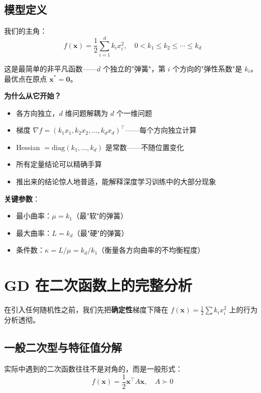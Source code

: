 \documentclass[12pt, a4paper]{ctexart}
\begin{document}
\subsection{模型定义}

我们的主角：
\begin{equation}
    f(\bm{x}) = \frac{1}{2}\sum_{i=1}^{d} k_i x_i^2, \quad 0 < k_1 \leq k_2 \leq \cdots \leq k_d
\end{equation}

这是最简单的非平凡函数——$d$ 个独立的"弹簧"，第 $i$ 个方向的"弹性系数"是 $k_i$。最优点在原点 $\bm{x}^* = \bm{0}$。

\textbf{为什么从它开始？}
\begin{itemize}
    \item 各方向独立，$d$ 维问题解耦为 $d$ 个一维问题
    \item 梯度 $\nabla f = (k_1 x_1, k_2 x_2, \ldots, k_d x_d)^\top$——每个方向独立计算
    \item Hessian $= \text{diag}(k_1, \ldots, k_d)$ 是常数——不随位置变化
    \item 所有定量结论可以精确手算
    \item 推出来的结论惊人地普适，能解释深度学习训练中的大部分现象
\end{itemize}

\textbf{关键参数}：
\begin{itemize}
    \item 最小曲率：$\mu = k_1$（最"软"的弹簧）
    \item 最大曲率：$L = k_d$（最"硬"的弹簧）
    \item 条件数：$\kappa = L/\mu = k_d/k_1$（衡量各方向曲率的不均衡程度）
\end{itemize}


\section{GD 在二次函数上的完整分析}

在引入任何随机性之前，我们先把\textbf{确定性}梯度下降在 $f(\bm{x}) = \frac{1}{2}\sum k_i x_i^2$ 上的行为分析透彻。

\subsection{一般二次型与特征值分解}

实际中遇到的二次函数往往不是对角的，而是一般形式：
\begin{equation}
    f(\bm{x}) = \frac{1}{2}\bm{x}^\top A \bm{x}, \quad A \succ 0
\end{equation}
\end{document}
